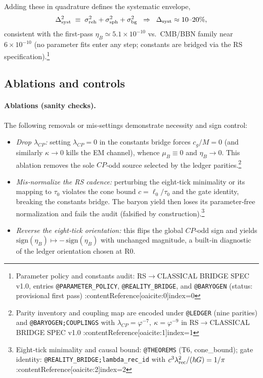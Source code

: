 \documentclass[11pt]{article}
\begin{document}
Adding these in quadrature defines the systematic envelope,
\begin{equation}
  \Delta_{\rm syst}^2 \;\equiv\; \sigma_{\rm reh}^2+\sigma_{\rm sph}^2+\sigma_{\rm bg}^2
  \;\;\Rightarrow\;\;
  \Delta_{\rm syst}\approx 10\text{–}20\%,
\end{equation}
consistent with the first‑pass \(\eta_B\simeq 5.1\times 10^{-10}\) vs.\ CMB/BBN family near \(6\times 10^{-10}\) (no parameter fits enter any step; constants are bridged via the RS specification).\footnote{Parameter policy and constants audit: RS\(\to\)CLASSICAL BRIDGE SPEC v1.0, entries \texttt{@PARAMETER\_POLICY}, \texttt{@REALITY\_BRIDGE}, and \texttt{@BARYOGEN} (status: provisional first pass) :contentReference[oaicite:0]{index=0}}

\subsection{Ablations and controls}

\paragraph{Ablations (sanity checks).}
The following removals or mis‑settings demonstrate necessity and sign control:
\begin{itemize}
  \item \emph{Drop \(\lambda_{CP}\):} setting \(\lambda_{CP}=0\) in the constants bridge forces \(c_g/M=0\) (and similarly \(\kappa\to 0\) kills the EM channel), whence \(\mu_B\equiv 0\) and \(\eta_B\to 0\). This ablation removes the sole \(CP\)‑odd source selected by the ledger parities.\footnote{Parity inventory and coupling map are encoded under \texttt{@LEDGER} (nine parities) and \texttt{@BARYOGEN;COUPLINGS} with \(\lambda_{CP}=\varphi^{-7},\ \kappa=\varphi^{-9}\) in RS\(\to\)CLASSICAL BRIDGE SPEC v1.0 :contentReference[oaicite:1]{index=1}}
  \item \emph{Mis‑normalize the RS cadence:} perturbing the eight‑tick minimality or its mapping to \(\tau_0\) violates the cone bound \(c=\ell_0/\tau_0\) and the gate identity, breaking the constants bridge. The baryon yield then loses its parameter‑free normalization and fails the audit (falsified by construction).\footnote{Eight‑tick minimality and causal bound: \texttt{@THEOREMS} (T6, cone\_bound); gate identity: \texttt{@REALITY\_BRIDGE;lambda\_rec\_id} with \(c^3\lambda_{\rm rec}^2/(\hbar G)=1/\pi\) :contentReference[oaicite:2]{index=2}}
  \item \emph{Reverse the eight‑tick orientation:} this flips the global \(CP\)‑odd sign and yields \(\mathrm{sign}(\eta_B)\mapsto -\,\mathrm{sign}(\eta_B)\) with unchanged magnitude, a built‑in diagnostic of the ledger orientation chosen at R0.
\end{itemize}
\end{document}
